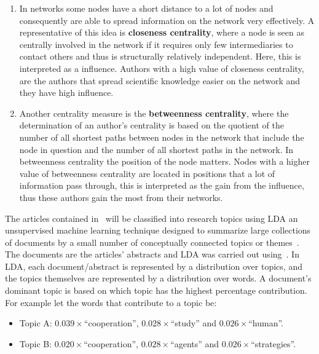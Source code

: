 \documentclass{article}
\theoremstyle{definition}
\begin{document}
\begin{enumerate}
    \item In networks some nodes have a short distance to a lot of nodes and
    consequently are able to spread information on the network very effectively.
    A representative of this idea is \textbf{closeness centrality}, where a node
    is seen as centrally involved in the network if it requires only few
    intermediaries to contact others and thus is structurally relatively
    independent. Here, this is interpreted as a influence. Authors with a high
    value of closeness centrality, are the authors that spread scientific
    knowledge easier on the network and they have high influence.
    \item Another centrality measure is the \textbf{betweenness centrality},
    where the determination of an author's centrality is based on the quotient
    of the number of all shortest paths between nodes in the network that
    include the node in question and the number of all shortest paths in the
    network. In betweenness centrality the position of the node matters. Nodes
    with a higher value of betweenness centrality are located in positions that
    a lot of information pass through, this is interpreted as the gain from
    the influence, thus these authors gain the most from their networks.
\end{enumerate}

The articles contained in~\cite{pd_data_2018} will be classified
into research topics using LDA an unsupervised machine learning technique
designed to summarize large collections of documents by a small number of
conceptually connected topics or themes~\cite{Blei2003, Grimmer2013}. The
documents are the articles' abstracts and LDA was carried out using~\cite{rehurek_lrec}.
In LDA, each document/abstract is represented by a distribution over topics, 
and the topics themselves are represented by a distribution over words. A
document's dominant topic is based on which topic has the highest percentage
contribution. For example let the words that contribute to a topic be:

\begin{itemize}
    \item Topic A: \(0.039 \times\)``cooperation'', \(0.028 \times\)``study'' and \(0.026 \times\)``human''.
    \item Topic B: \(0.020 \times\)``cooperation'', \(0.028 \times\)``agents'' and
    \(0.026 \times\)``strategies''.
\end{itemize}
\end{document}
